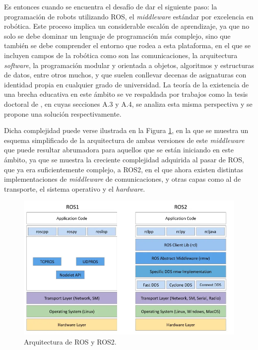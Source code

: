 Es entonces cuando se encuentra el desafío de dar el siguiente paso: la
programación de robots utilizando ROS, el \textit{middleware} estándar por
excelencia en robótica.
Este proceso implica un considerable escalón de aprendizaje, ya que no solo se
debe dominar un lenguaje de programación más complejo, sino que también se debe
comprender el entorno que rodea a esta plataforma, en el que se incluyen campos
de la robótica como son las comunicaciones, la arquitectura \textit{software},
la programación modular y orientada a objetos, algoritmos y estructuras de
datos, entre otros muchos, y que suelen conllevar decenas de asignaturas con
identidad propia en cualquier grado de universidad.
La teoría de la existencia de una brecha educativa en este ámbito se ve
respaldada por trabajos como la tesis doctoral de \cite{vega18b}, en cuyas
secciones A.3 y A.4, se analiza esta misma perspectiva y se propone una solución
respectivamente.

Dicha complejidad puede verse ilustrada en la Figura \ref{fig:ros}, en la que se
muestra un esquema simplificado de la arquitectura de ambas versiones de este
\textit{middleware} que puede resultar abrumadora para aquellos que se están
iniciando en este ámbito, ya que se muestra la creciente complejidad adquirida
al pasar de ROS, que ya era suficientemente complejo, a ROS2, en el que ahora
existen distintas implementaciones de \textit{middleware} de comunicaciones, y
otras capas como al de transporte, el sistema operativo y el \textit{hardware}.

\begin{figure} [h!]
  \begin{center}
    \includegraphics[width=12cm]{figs/ROS_and_ROS2}
  \end{center}
  \caption{Arquitectura de ROS y ROS2.}
  \label{fig:ros}
\end{figure}\

